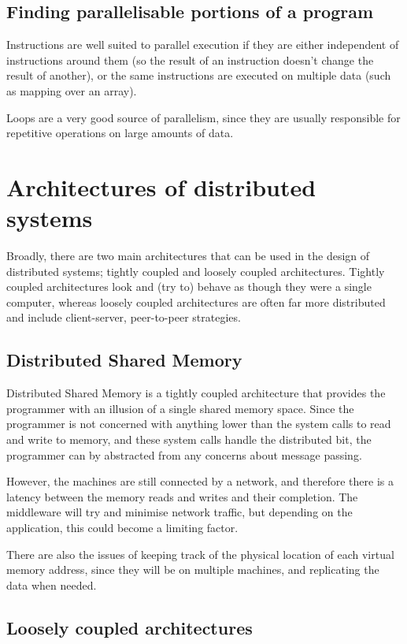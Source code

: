 \subsection{Finding parallelisable portions of a program}

Instructions are well suited to parallel execution if they are either
independent of instructions around them (so the result of an instruction doesn't
change the result of another), or the same instructions are executed on multiple
data (such as mapping over an array).

Loops are a very good source of parallelism, since they are usually responsible
for repetitive operations on large amounts of data.

\section{Architectures of distributed systems}

Broadly, there are two main architectures that can be used in the design of
distributed systems; tightly coupled and loosely coupled architectures. Tightly
coupled architectures look and (try to) behave as though they were a single
computer, whereas loosely coupled architectures are often far more distributed
and include client-server, peer-to-peer strategies.

\subsection{Distributed Shared Memory}

Distributed Shared Memory is a tightly coupled architecture that provides the
programmer with an illusion of a single shared memory space. Since the
programmer is not concerned with anything lower than the system calls to read
and write to memory, and these system calls handle the distributed bit, the
programmer can by abstracted from any concerns about message passing.

However, the machines are still connected by a network, and therefore there is a
latency between the memory reads and writes and their completion. The middleware
will try and minimise network traffic, but depending on the application, this
could become a limiting factor.

There are also the issues of keeping track of the physical location of each
virtual memory address, since they will be on multiple machines, and replicating
the data when needed.

\subsection{Loosely coupled architectures}

